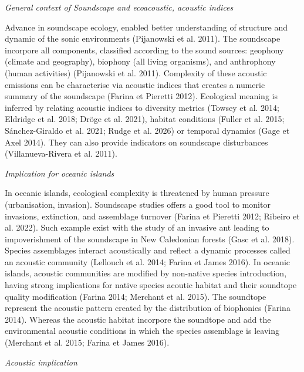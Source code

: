 \documentclass[
  french,
  11pt,
]{stylisharticle}
\begin{document}
\emph{General context of Soundscape and ecoacoustic, acoustic indices}

Advance in soundscape ecology, enabled better understanding of structure
and dynamic of the sonic environments (Pijanowski et al. 2011). The
soundscape incorpore all components, classified according to the sound
sources: geophony (climate and geography), biophony (all living
organisms), and anthrophony (human activities) (Pijanowski et al. 2011).
Complexity of these acoustic emissions can be characterise via acoustic
indices that creates a numeric summary of the soundscape (Farina et
Pieretti 2012). Ecological meaning is inferred by relating acoustic
indices to diversity metrics (Towsey et al. 2014; Eldridge et al. 2018;
Dröge et al. 2021), habitat conditions (Fuller et al. 2015;
Sánchez-Giraldo et al. 2021; Rudge et al. 2026) or temporal dynamics
(Gage et Axel 2014). They can also provide indicators on soundscape
disturbances (Villanueva-Rivera et al. 2011).

\emph{Implication for oceanic islands}

In oceanic islands, ecological complexity is threatened by human
pressure (urbanisation, invasion). Soundscape studies offers a good tool
to monitor invasions, extinction, and assemblage turnover (Farina et
Pieretti 2012; Ribeiro et al. 2022). Such example exist with the study
of an invasive ant leading to impoverishment of the soundscape in New
Caledonian forests (Gasc et al. 2018). Species assemblages interact
acoustically and reflect a dynamic processes called an acoustic
community (Lellouch et al. 2014; Farina et James 2016). In oceanic
islands, acoustic communities are modified by non-native species
introduction, having strong implications for native species acoutic
habitat and their soundtope quality modification (Farina 2014; Merchant
et al. 2015). The soundtope represent the acoustic pattern created by
the distribution of biophonies (Farina 2014). Whereas the acoustic
habitat incorpore the soundtope and add the environmental acoustic
conditions in which the species assemblage is leaving (Merchant et al.
2015; Farina et James 2016).

\emph{Acoustic implication}
\end{document}
